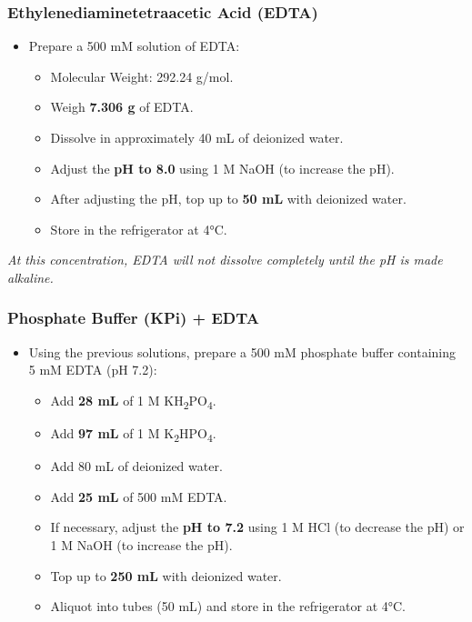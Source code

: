 \documentclass[
  9pt,
  american,
  a5paper,
  extrafontsizes,onecolumn,openright
  ]{memoir}
\providecommand{\tightlist}{%
  \setlength{\itemsep}{0pt}\setlength{\parskip}{0pt}}
\begin{document}
\subsubsection{Ethylenediaminetetraacetic Acid (EDTA)}\label{ethylenediaminetetraacetic-acid-edta}

\begin{itemize}
\tightlist
\item
  Prepare a 500 mM solution of EDTA:

  \begin{itemize}
  \tightlist
  \item
    Molecular Weight: 292.24 g/mol.
  \item
    Weigh \textbf{7.306 g} of EDTA.
  \item
    Dissolve in approximately 40 mL of deionized water.
  \item
    Adjust the \textbf{pH to 8.0} using 1 M NaOH (to increase the pH).
  \item
    After adjusting the pH, top up to \textbf{50 mL} with deionized water.
  \item
    Store in the refrigerator at 4°C.
  \end{itemize}
\end{itemize}

\begin{greybox}[frametitle = Note]
\emph{At this concentration, EDTA will not dissolve completely until the pH is made alkaline.}

\end{greybox}

\subsubsection{Phosphate Buffer (KPi) + EDTA}\label{phosphate-buffer-kpi-edta-1}

\begin{itemize}
\tightlist
\item
  Using the previous solutions, prepare a 500 mM phosphate buffer containing 5 mM EDTA (pH 7.2):

  \begin{itemize}
  \tightlist
  \item
    Add \textbf{28 mL} of 1 M KH\textsubscript{2}PO\textsubscript{4}.
  \item
    Add \textbf{97 mL} of 1 M K\textsubscript{2}HPO\textsubscript{4}.
  \item
    Add 80 mL of deionized water.
  \item
    Add \textbf{25 mL} of 500 mM EDTA.
  \item
    If necessary, adjust the \textbf{pH to 7.2} using 1 M HCl (to decrease the pH) or 1 M NaOH (to increase the pH).
  \item
    Top up to \textbf{250 mL} with deionized water.
  \item
    Aliquot into tubes (50 mL) and store in the refrigerator at 4°C.
  \end{itemize}
\end{itemize}
\end{document}
